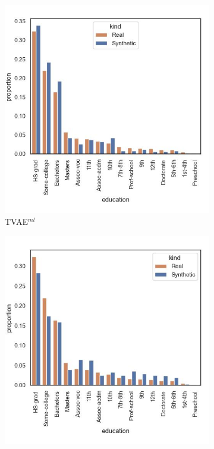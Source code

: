 \begin{figure}[H]
	\centering
	\begin{subfigure}{0.3\textwidth}
		\centering
		\includegraphics[width=\textwidth]{images/dist_education/tvae.jpg}
		\caption{TVAE$^{ml}$}
	\end{subfigure}
	\begin{subfigure}{0.3\textwidth}
		\centering
		\includegraphics[width=\textwidth]{images/dist_education/ctabgan.jpg}

\end{subfigure}
\end{figure}
